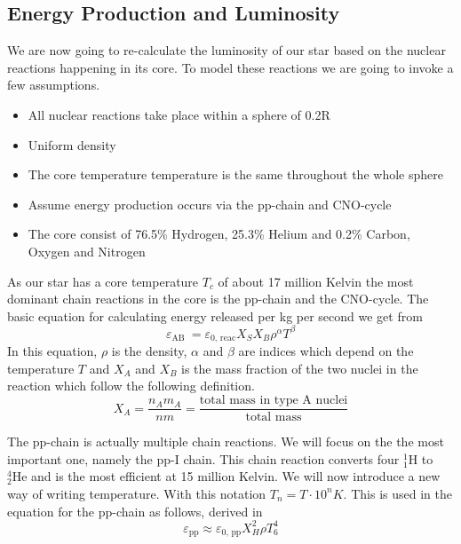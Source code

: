 \documentclass[reprint,english,notitlepage]{revtex4-2}
\begin{document}
\subsection{Energy Production and Luminosity}
We are now going to re-calculate the luminosity of our star based on the nuclear reactions happening in its core. To model these reactions we are going to invoke a few assumptions. 
\begin{itemize}
  \item All nuclear reactions take place within a sphere of 0.2R 
  \item Uniform density
  \item The core temperature temperature is the same throughout the whole sphere
  \item Assume energy production occurs via the pp-chain and CNO-cycle
  \item The core consist of 76.5\% Hydrogen, 25.3\% Helium and 0.2\% Carbon, Oxygen and Nitrogen 
\end{itemize}
As our star has a core temperature $ T_c $ of about 17 million Kelvin the most dominant chain reactions in the core is the pp-chain and the CNO-cycle. The basic equation for calculating energy released per kg per second we get from%
\begin{equation}\label{eq: chain reaction}
  ε_{\text{AB }} = ε_{\text{0, reac}} X_{S} X_{B} ρ^{α} T^{β}
\end{equation}
In this equation, $ \rho $ is the density, $ \alpha $ and $ \beta $ are indices which depend on the temperature $ T $ and $ X_{A} $ and $ X_{B} $ is the mass fraction of the two nuclei in the reaction which follow the following definition.
\[
X_{A} = \frac{n_{A}m_{A}}{nm} = \frac{\text{total mass in type A nuclei}}{\text{total mass}}
\]

The pp-chain is actually multiple chain reactions. We will focus on the the most important one, namely the pp-I chain. This chain reaction converts four $ _{1}^{1}\text{H} $ to $ _{2}^{4}\text{He} $ and is the most efficient at 15 million Kelvin. We will now introduce a new way of writing temperature. With this notation $ T_{n} = T ⋅ 10^{n}K $. This is used in the equation for the pp-chain as follows, derived in%
\begin{equation}\label{eq: pp-chain}
  ε_{\text{pp}} ≈ ε_{\text{0, pp}}X^{2}_{H}ρ T^{4}_{6}
\end{equation}
\end{document}
